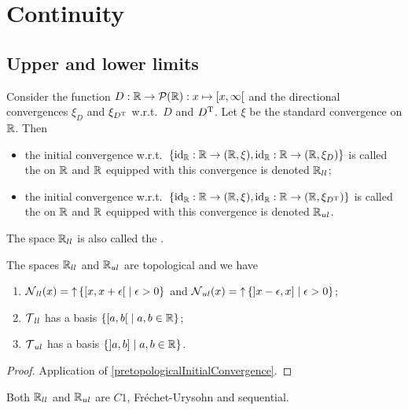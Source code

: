\section{Continuity}

\subsection{Upper and lower limits}
\begin{definition}
Consider the function $D: \R \to\powerset(\R): x\mapsto \interval[co]{x,\infty}$ and the directional convergences $\xi_D$ and $\xi_{D^{\mathrm{T}}}$ w.r.t.\ $D$ and $D^{\mathrm{T}}$. Let $\xi$ be the standard convergence on $\mathbb{R}$.
Then
\begin{itemize}
\item the initial convergence w.r.t.\ $\{\id_\R: \R\to \sSet{\R,\xi}, \id_\R: \R\to \sSet{\R,\xi_D}\}$ is called the  on $\mathbb{R}$ and $\mathbb{R}$ equipped with this convergence is denoted $\mathbb{R}_{ll}$;
\item the initial convergence w.r.t.\ $\{\id_\R: \R\to \sSet{\R,\xi}, \id_\R: \R\to \sSet{\R,\xi_{D^\transp}}\}$ is called the  on $\mathbb{R}$ and $\mathbb{R}$ equipped with this convergence is denoted $\mathbb{R}_{ul}$.
\end{itemize}
The space $\mathbb{R}_{ll}$ is also called the .
\end{definition}

\begin{proposition}
The spaces $\mathbb{R}_{ll}$ and $\mathbb{R}_{ul}$ are topological and we have
\begin{enumerate}
\item $\neighbourhood_{ll}(x) = \upset \setbuilder{\interval[co]{x,x+\epsilon}}{\epsilon > 0}$ and $\neighbourhood_{ul}(x) = \upset \setbuilder{\interval[oc]{x-\epsilon, x}}{\epsilon > 0}$;
\item $\operatorname{\mathcal{T}}_{ll}$ has a basis $\setbuilder{\interval[co]{a,b}}{a,b\in \R}$;
\item $\operatorname{\mathcal{T}}_{ul}$ has a basis $\setbuilder{\interval[oc]{a,b}}{a,b\in \R}$.
\end{enumerate}
\end{proposition}
\begin{proof}
Application of \ref{pretopologicalInitialConvergence}.
\end{proof}
\begin{corollary} \label{SorgenfreyLineC1}
Both $\mathbb{R}_{ll}$ and $\mathbb{R}_{ul}$ are $C1$, Fréchet-Urysohn and sequential.
\end{corollary}

